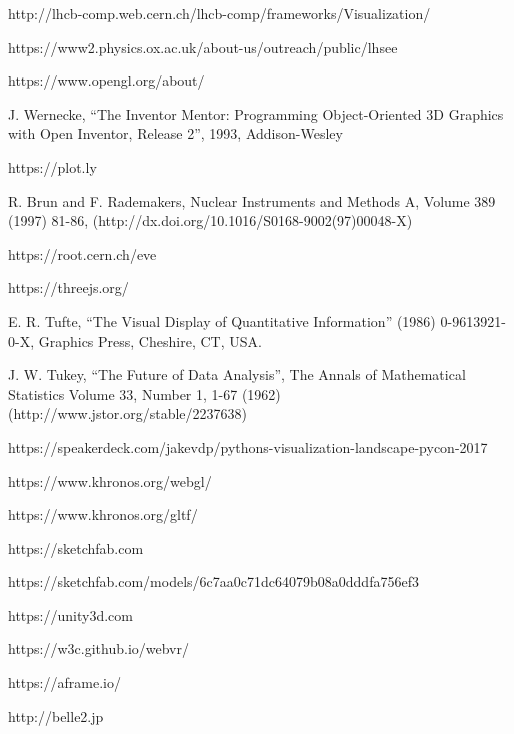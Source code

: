 \documentclass[12pt,a4paper]{article}
\begin{document}
\begin{thebibliography}{999}
 http://lhcb-comp.web.cern.ch/lhcb-comp/frameworks/Visualization/

 https://www2.physics.ox.ac.uk/about-us/outreach/public/lhsee

 https://www.opengl.org/about/

 J. Wernecke, “The  Inventor Mentor: Programming Object-Oriented 3D Graphics with Open Inventor, Release 2”, 1993, Addison-Wesley

 https://plot.ly

 R. Brun and F. Rademakers, Nuclear Instruments and Methods A, Volume 389 (1997) 81-86, (http://dx.doi.org/10.1016/S0168-9002(97)00048-X)

 https://root.cern.ch/eve

 https://threejs.org/

 E. R. Tufte, “The Visual Display of Quantitative Information” (1986) 0-9613921-0-X, Graphics Press, Cheshire, CT, USA.

 J. W. Tukey, “The Future of Data Analysis”, The Annals of Mathematical Statistics Volume 33, Number 1, 1-67 (1962) (http://www.jstor.org/stable/2237638)

 https://speakerdeck.com/jakevdp/pythons-visualization-landscape-pycon-2017

 https://www.khronos.org/webgl/

 https://www.khronos.org/gltf/

 https://sketchfab.com

 https://sketchfab.com/models/6c7aa0c71dc64079b08a0dddfa756ef3

 https://unity3d.com

 https://w3c.github.io/webvr/

 https://aframe.io/

 http://belle2.jp

\end{thebibliography}

\sloppy
\raggedright
\clearpage
\end{document}
